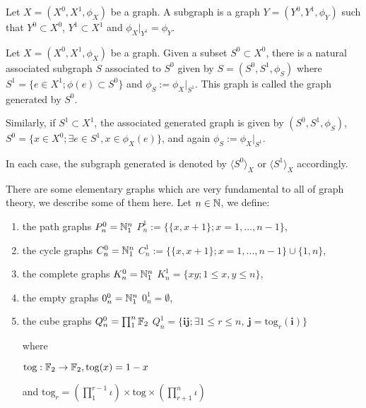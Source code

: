 \begin{definition}
	Let $X=(X^0, X^1, \phi_X)$ be a graph. A subgraph is a graph $Y=(Y^0, Y^1, \phi_Y)$ such that $Y^0\subset X^0$, $Y^1\subset X^1$ and $\phi_X|_{Y^1}=\phi_Y$.
\end{definition}

\begin{definition}
	Let $X=(X^0, X^1, \phi_X)$ be a graph.	Given a subset $S^0 \subset X^0$, there is a natural associated subgraph $S$ associated to $S^0$ given by $S=(S^0, S^1, \phi_S)$ where $S^1=\{e \in X^1; \phi(e)\subset S^0 \}$ and $\phi_S := \phi_X|_{S^1}$. This graph is called the graph generated by $S^0$. 
	
	Similarly, if $S^1 \subset X^1$, the associated generated graph is given by $(S^0, S^1, \phi_S)$, $S^0=\{x \in X^0; \exists e \in S^1, x \in \phi_X(e)\}$, and again $\phi_S:=\phi_X|_{S^1}$.
	
	In each case, the subgraph generated is denoted by $\langle S^0 \rangle_X$ or $\langle S^1 \rangle_X$ accordingly.
\end{definition}

\begin{exmp}
	There are some elementary graphs which are very fundamental to all of graph theory, we describe some of them here. Let $n \in \mathbb{N}$, we define:
	
	\begin{enumerate}
		\item  the path graphs
		\subitem $P_n^0 = \mathbb{N}^n_1$
		\subitem $P_n^1 := \{\{x,x+1\}; x = 1, ..., n-1\}$,
		
		\item the cycle graphs
		\subitem $C_n^0 = \mathbb{N}^n_1$
		\subitem $C_n^1 := \{\{x,x+1\}; x = 1, ..., n-1\} \cup \{1, n\}$,
		
		\item the complete graphs
		\subitem $K_n^0 = \mathbb{N}^n_1$
		\subitem $K_n^1 = \{xy; 1 \leq x,y \leq n \}$,
		
		\item the empty graphs
		\subitem $0_n^0 = \mathbb{N}^n_1$
		\subitem $0_n^1 = \emptyset$,
		
		\item the cube graphs
		\subitem $Q_n^0 = \prod_{1}^{n} \mathbb{F}_2$
		\subitem $Q_n^1 = \{\textbf{i}\textbf{j}; \exists 1\leq r\leq n, \ \textbf{j}=\text{tog}_r(\textbf{i})\}$
		
		\noindent where 
		
		\begin{center}
			$\text{tog}:\mathbb{F}_2 \rightarrow \mathbb{F}_2, \text{tog}(x) = 1-x$ 
			
			and $\text{tog}_r = (\prod_1^{r-1}\iota) \times \text{tog} \times (\prod_{r+1}^n \iota)$
		\end{center}
		
	\end{enumerate}
	
\end{exmp}

